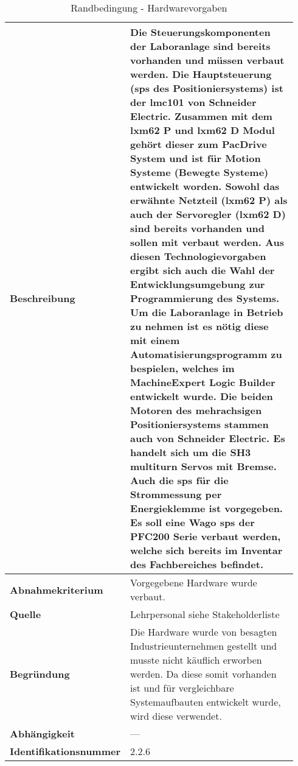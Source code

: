 \documentclass[../../../Bachelorarbeit.tex]{subfiles}
\begin{document}
\begin{table}[H]
    \centering
    \begin{tabular}{| p{0.34\linewidth} | p{0.6\linewidth} |}
        \hline
        \textbf{Beschreibung} & Die Steuerungskomponenten der Laboranlage sind bereits vorhanden und müssen verbaut werden. Die Hauptsteuerung (\acs{sps} des Positioniersystems) ist der \acs{lmc}101 von Schneider Electric. Zusammen mit dem \acs{lxm}62 P und \acs{lxm}62 D Modul gehört dieser zum PacDrive System und ist für Motion Systeme (Bewegte Systeme) entwickelt worden. Sowohl das erwähnte Netzteil (\acs{lxm}62 P) als auch der Servoregler (\acs{lxm}62 D) sind bereits vorhanden und sollen mit verbaut werden. Aus diesen Technologievorgaben ergibt sich auch die Wahl der Entwicklungsumgebung zur Programmierung des Systems. Um die Laboranlage in Betrieb zu nehmen ist es nötig diese mit einem Automatisierungsprogramm zu bespielen, welches im MachineExpert Logic Builder entwickelt wurde. Die beiden Motoren des mehrachsigen Positioniersystems stammen auch von Schneider Electric. Es handelt sich um die SH3 multiturn Servos mit Bremse. Auch die \acs{sps} für die Strommessung per Energieklemme ist vorgegeben. Es soll eine Wago \acs{sps} der PFC200 Serie verbaut werden, welche sich bereits im Inventar des Fachbereiches befindet. \\ \hline
        \textbf{Abnahmekriterium} & Vorgegebene Hardware wurde verbaut. \\ \hline
        \textbf{Quelle} & Lehrpersonal siehe Stakeholderliste \\ \hline
        \textbf{Begründung} & Die Hardware wurde von besagten Industrieunternehmen gestellt und musste nicht käuflich erworben werden. Da diese somit vorhanden ist und für vergleichbare Systemaufbauten entwickelt wurde, wird diese verwendet. \\ \hline
        \textbf{Abhängigkeit} & -\xspace -\xspace - \\ \hline
        \textbf{Identifikationsnummer} & 2.2.6 \\ \hline
    \end{tabular}
    \caption[\acs{nfa} - Hardwarevorgaben]{Randbedingung - Hardwarevorgaben}
    \label{tab:my-table26}
\end{table}

\end{document}
